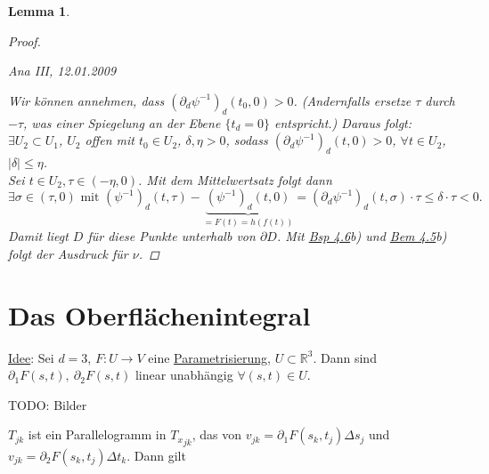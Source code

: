 \documentclass[a4paper]{scrreprt}
\newcommand{\R}{\mathbb{R}}
\newcommand{\jlabel}[1]{\label{j_#1}}
\newcommand{\jhyperref}[2]{\hyperref[j_#1]{#2}}
\newcommand{\jlink}[1]{\jhyperref{#1}{#1}}
\newcommand{\jabb}[3]{ #1: #2 \rightarrow #3 }
\newcommand{\jspace}{\vspace{8pt}}
\newcommand{\jspacesmall}{\vspace{4pt}}
\newcommand{\jdate}[1]{\jspacesmall\begin{center}\jlabel{#1}\tiny{Ana III, #1}\end{center}}
\theoremstyle{plain}
\newtheorem{lem}[thm]{Lemma}
\theoremstyle{definition}
\begin{document}
{{{{\begin{lem}
\begin{proof}
\jdate{12.01.2009}
        
        Wir können annehmen, dass $(\partial_d \psi^{-1})_d(t_0,0)>0$. (Andernfalls ersetze $\tau$ durch $-\tau$, was einer Spiegelung an der Ebene $\{t_d=0\}$ entspricht.) Daraus folgt: $\exists U_2\subset U_1$, $U_2$ offen mit $t_0\in U_2$, $\delta, \eta>0$, sodass $(\partial_d \psi^{-1})_d(t,0) > 0$, $\forall t \in U_2$, $|\delta| \le \eta$.\\
        Sei $t\in U_2, \tau \in (-\eta, 0)$. Mit dem Mittelwertsatz folgt dann
        \[
            \exists \sigma \in (\tau,0) \text{ mit } (\psi^{-1})_d(t,\tau) - \underbrace{(\psi^{-1})_d(t,0)}_{=F(t)=h(f(t))} = (\partial_d \psi^{-1})_d(t,\sigma)\cdot \tau \le \delta \cdot \tau < 0.
        \]
        Damit liegt $D$ für diese Punkte unterhalb von $\partial D$. Mit \jlink{Bsp 4.6}b) und \jlink{Bem 4.5}b) folgt der Ausdruck für $\nu$.
    \end{proof}
\end{lem}

        

\section{Das Oberflächenintegral}

\uline{Idee}: Sei $d=3$, $\jabb{F}{U}{V}$ eine \jlink{Parametrisierung}, $U\subset \R^3$. Dann sind $\partial_1 F(s,t), \ \partial_2 F(s,t)$ linear unabhängig $\forall (s,t)\in U$.

\jspace

TODO: Bilder

\jspace

$T_{jk}$ ist ein Parallelogramm in ${T_x}_{jk}$, das von $v_{jk} = \partial_1 F(s_k,t_j)\Delta s_j$ und $v_{jk} = \partial_2 F(s_k,t_j)\Delta t_k$. Dann gilt

}}}}
\end{document}
